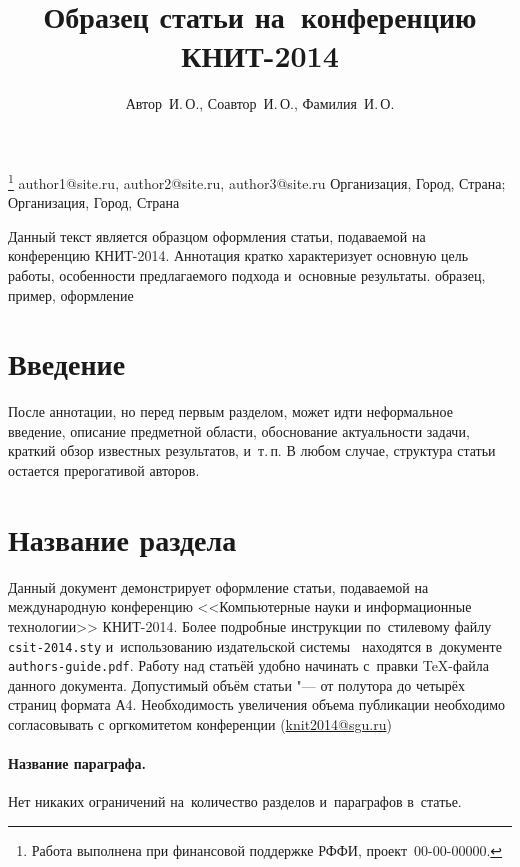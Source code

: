 \documentclass[10pt]{article}
\begin{document}
\title
    {Образец статьи на~конференцию КНИТ-2014}
\author
    {Автор~И.\,О., Соавтор~И.\,О., Фамилия~И.\,О.}
\thanks
    {Работа выполнена при финансовой поддержке РФФИ, проект \No\,00-00-00000.}
\email
    {author1@site.ru, author2@site.ru, author3@site.ru}
\organization
    {Организация, Город, Страна; Организация, Город, Страна}
    
\abstract
    {Данный текст является образцом оформления статьи, подаваемой на конференцию КНИТ-2014.
    Аннотация кратко характеризует основную цель работы,
    особенности предлагаемого подхода и~основные результаты.}
\keywords
    {образец, пример, оформление}

\maketitle

\section*{Введение}
После аннотации, но перед первым разделом,
может идти неформальное введение,
описание предметной области,
обоснование актуальности задачи,
краткий обзор известных результатов,
и~т.\,п. В любом случае, структура статьи остается прерогативой авторов.

\section{Название раздела}
Данный документ демонстрирует оформление статьи,
подаваемой на международную конференцию
<<Компьютерные науки и информационные технологии>> \mbox{КНИТ-2014}.
Более подробные инструкции по~стилевому файлу \texttt{csit-2014.sty}
и~использованию издательской системы \LaTeXe\
находятся в~документе \texttt{authors-guide.pdf}.
Работу над статьёй удобно начинать с~правки \TeX-файла данного документа.
Допустимый объём статьи "--- от полутора до четырёх страниц формата А4. 
Необходимость увеличения объема публикации необходимо согласовывать 
с оргкомитетом конференции (\url{knit2014@sgu.ru})

\paragraph{Название параграфа.}
Нет никаких ограничений на~количество разделов и~параграфов в~статье.
\end{document}
